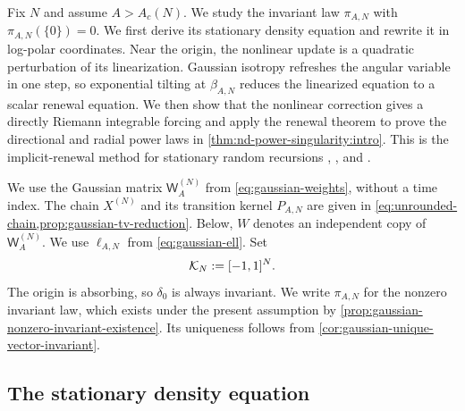 \documentclass[11pt,reqno,a4paper]{article}
\begin{document}
Fix $N$ and assume $A>A_c(N)$. We study the invariant law $\pi_{A,N}$ with
$\pi_{A,N}(\{0\})=0$. We first derive its stationary
density equation and rewrite it in log-polar coordinates. Near the origin, the
nonlinear update is a quadratic perturbation of its linearization. Gaussian
isotropy refreshes the angular variable in one step, so exponential tilting at
$\beta_{A,N}$ reduces the linearized equation to a scalar renewal equation. We
then show that the nonlinear correction gives a directly Riemann integrable
forcing and apply the renewal theorem to prove the directional and radial
power laws in \cref{thm:nd-power-singularity:intro}. This is the
implicit-renewal method for stationary random recursions \cite{kesten1973},
\cite{goldie1991}, and \cite{buraczewski-damek-mikosch2016}.

We use the Gaussian matrix $\mathsf W_A^{(N)}$ from
\cref{eq:gaussian-weights}, without a time index. The chain $X^{(N)}$ and its
transition kernel $P_{A,N}$ are given in
\cref{eq:unrounded-chain,prop:gaussian-tv-reduction}. Below, $W$ denotes an
independent copy of $\mathsf W_A^{(N)}$. We use $\ell_{A,N}$ from
\cref{eq:gaussian-ell}. Set
\begin{equation*}
  \mathcal K_N:=[-1,1]^N .
\end{equation*}
The origin is absorbing, so $\delta_0$ is always invariant. We write
$\pi_{A,N}$ for the nonzero invariant law, which exists under the present
assumption by \cref{prop:gaussian-nonzero-invariant-existence}. Its uniqueness
follows from \cref{cor:gaussian-unique-vector-invariant}.

\subsection{The stationary density equation}
\label{subsec:nd-stationary-density}
\end{document}
